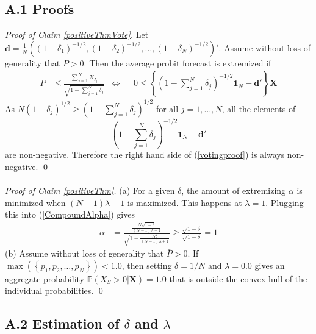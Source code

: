 \documentclass[11pt]{article}
\renewcommand{\P}{\mathbb{P}}
\theoremstyle{definition}
\theoremstyle{definition}
\begin{document}
\subsection*{A.1  Proofs}
\textit{Proof of Claim \ref{positiveThmVote}.} Let $\boldsymbol{d} = \frac{1}{N}\left((1-\delta_1)^{-1/2}, (1-\delta_2)^{-1/2}, \dots, (1-\delta_N)^{-1/2}\right)'$. Assume without loss of generality that $\bar{P} > 0$. Then the average probit forecast is extremized if
\begin{align}
 \bar{P}&\leq  \frac{\sum_{j=1}^N X_{I_j}}{\sqrt{1 - \sum_{j=1}^N \delta_j}} &\Leftrightarrow&& 0 \leq  \left\{  \left(1 - \sum_{j=1}^N \delta_j \right)^{-1/2} \boldsymbol{1}_N - \boldsymbol{d}' \right\} \boldsymbol{X} \label{votingproof}
\end{align}
 As $N (1-\delta_j)^{1/2} \geq \left(1 - \sum_{j=1}^N \delta_j \right)^{1/2}$ for all $j = 1, \dots, N$, all the elements of $$\left(1 - \sum_{j=1}^N \delta_j \right)^{-1/2} \boldsymbol{1}_N - \boldsymbol{d}' $$ are non-negative. Therefore the right hand side of (\ref{votingproof}) is always non-negative. \qed
 \\
 \\
\noindent
\textit{Proof of Claim \ref{positiveThm}.} (a) For a given $\delta$, the amount of extremizing $\alpha$ is minimized when $(N-1)\lambda +1$ is maximized. This happens at $\lambda = 1$. Plugging this into (\ref{CompoundAlpha}) gives
\begin{align*}
\alpha &= \frac{\frac{N\sqrt{1-\delta}}{(N-1)\lambda +1}}{\sqrt{1- \frac{N\delta}{(N-1)\lambda +1} }}  \geq \frac{\sqrt{1-\delta}}{\sqrt{1-\delta }} = 1
\end{align*}
(b) Assume without loss of generality that $\bar{P} > 0$. If $\max(\left\{p_1, p_2, \dots, p_N \right\}) < 1.0$, then  setting $\delta = 1/N$ and $\lambda = 0.0$ gives an aggregate probability $\P\left(X_S > 0 | \boldsymbol{X}\right) = 1.0$ that is outside the convex hull of the individual probabilities.
\qed

\subsection*{A.2 Estimation of $\delta$ and $\lambda$}
\end{document}
